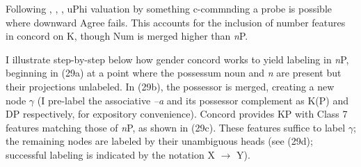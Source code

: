 \documentclass[output=paper
,modfonts
,nonflat]{langsci/langscibook}
\begin{document}
\begin{figure}[!h]
\begin{exe}
		\ex 
	\xlist
	\begin{multicols}{2}
\end{multicols}
	\endxlist
\end{exe}
\end{figure}
\noindent Following \citet{Bejar_Rezac2009}, \citet{Carstens2016}, \citet{Toosarvandani_Van_Urk2014}, uPhi valuation by something c-commnding a probe is possible where downward Agree fails. This accounts for the inclusion of number features in concord on K, though Num is merged higher than \textit{n}P.

I illustrate step-by-step below how gender concord works to yield labeling in \textit{n}P, beginning in (29a) at a point where the possessum noun and \textit{n} are present but their projections unlabeled. In (29b), the possessor is merged, creating a new node $\gamma$ (I pre-label the associative \textit{–a} and its possessor complement as K(P) and DP respectively, for expository convenience). Concord provides KP with Class 7 features matching those of \textit{n}P, as shown in (29c). These features suffice to label $\gamma$;  the remaining nodes are labeled by their unambiguous heads (see (29d); successful labeling is indicated by the notation X $\rightarrow$ Y).
\end{document}
